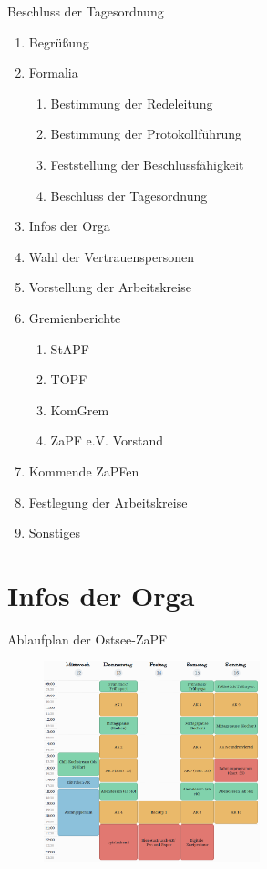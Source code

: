 \documentclass[compress, aspectratio=169]{beamer}
\begin{document}
	
	
	\begin{frame}{Beschluss der Tagesordnung}
		\begin{multicols}{2}
			\begin{enumerate}
				\item Begrüßung
				\item Formalia
				\begin{enumerate}
					\item Bestimmung der Redeleitung
					\item Bestimmung der Protokollführung
					\item Feststellung der Beschlussfähigkeit
					\item Beschluss der Tagesordnung
				\end{enumerate}
				\item Infos der Orga
				\item Wahl der Vertrauenspersonen
				\item Vorstellung der Arbeitskreise
				\item Gremienberichte
				\begin{enumerate}
					\item StAPF
					\item TOPF
					\item KomGrem
					\item ZaPF e.V. Vorstand
				\end{enumerate}
				\item Kommende ZaPFen
				\item Festlegung der Arbeitskreise
				\item Sonstiges
			\end{enumerate}
		\end{multicols}
	\end{frame}
	
	\section{Infos der Orga}
	
	\begin{frame}{Ablaufplan der Ostsee-ZaPF}
		\begin{figure}
			\centering
			\includegraphics[height=5.8cm]{Woche1.png}
		\end{figure}
	\end{frame}
	
\end{document}
